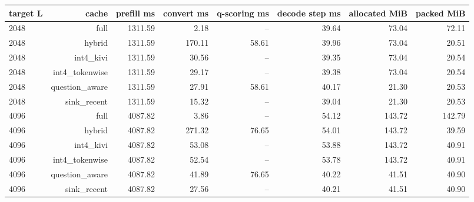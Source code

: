 \begin{tabular}{lrrrrrrr}
\toprule
target L & cache & prefill ms & convert ms & q-scoring ms & decode step ms & allocated MiB & packed MiB \\
\midrule
2048 & full & 1311.59 & 2.18 & -- & 39.64 & 73.04 & 72.11 \\
2048 & hybrid & 1311.59 & 170.11 & 58.61 & 39.96 & 73.04 & 20.51 \\
2048 & int4\_kivi & 1311.59 & 30.56 & -- & 39.35 & 73.04 & 20.54 \\
2048 & int4\_tokenwise & 1311.59 & 29.17 & -- & 39.38 & 73.04 & 20.54 \\
2048 & question\_aware & 1311.59 & 27.91 & 58.61 & 40.17 & 21.30 & 20.53 \\
2048 & sink\_recent & 1311.59 & 15.32 & -- & 39.04 & 21.30 & 20.53 \\
4096 & full & 4087.82 & 3.86 & -- & 54.12 & 143.72 & 142.79 \\
4096 & hybrid & 4087.82 & 271.32 & 76.65 & 54.01 & 143.72 & 39.59 \\
4096 & int4\_kivi & 4087.82 & 53.08 & -- & 53.88 & 143.72 & 40.91 \\
4096 & int4\_tokenwise & 4087.82 & 52.54 & -- & 53.78 & 143.72 & 40.91 \\
4096 & question\_aware & 4087.82 & 41.89 & 76.65 & 40.22 & 41.51 & 40.90 \\
4096 & sink\_recent & 4087.82 & 27.56 & -- & 40.21 & 41.51 & 40.90 \\
\bottomrule
\end{tabular}

